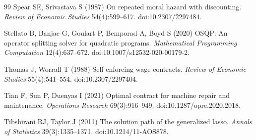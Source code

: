 \begin{thebibliography}{99}
Spear SE, Srivastava S (1987) On repeated moral hazard with discounting. \emph{Review of Economic Studies} 54(4):599--617. doi:10.2307/2297484.

Stellato B, Banjac G, Goulart P, Bemporad A, Boyd S (2020) OSQP: An operator splitting solver for quadratic programs. \emph{Mathematical Programming Computation} 12(4):637--672. doi:10.1007/s12532-020-00179-2.

Thomas J, Worrall T (1988) Self-enforcing wage contracts. \emph{Review of Economic Studies} 55(4):541--554. doi:10.2307/2297404.

Tian F, Sun P, Duenyas I (2021) Optimal contract for machine repair and maintenance. \emph{Operations Research} 69(3):916--949. doi:10.1287/opre.2020.2018.

Tibshirani RJ, Taylor J (2011) The solution path of the generalized lasso. \emph{Annals of Statistics} 39(3):1335--1371. doi:10.1214/11-AOS878.

\end{thebibliography}
